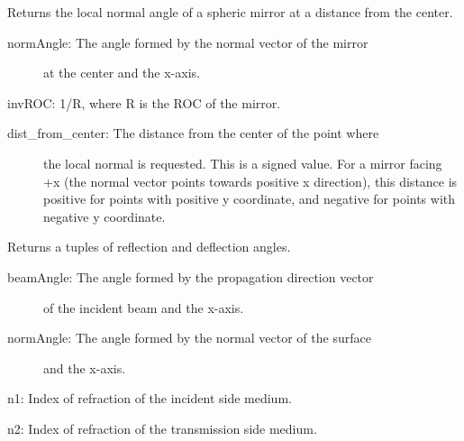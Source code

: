 \documentclass[letterpaper,10pt,english]{sphinxmanual}
\begin{document}

\begin{fulllineitems}
\label{api/gtrace.optics:gtrace.optics.geometric.normSpheric}
Returns the local normal angle of a spheric mirror
at a distance from the center.
\begin{description}
\item[{normAngle: The angle formed by the normal vector of the mirror}] \leavevmode
at the center and the x-axis.

\end{description}

invROC: 1/R, where R is the ROC of the mirror.
\begin{description}
\item[{dist\_from\_center: The distance from the center of the point where}] \leavevmode
the local normal is requested.
This is a signed value.
For a mirror facing +x (the normal vector points
towards positive x direction), this distance
is positive for points with positive y coordinate,
and negative for points with negative y coordinate.

\end{description}

\end{fulllineitems}


\begin{fulllineitems}
\label{api/gtrace.optics:gtrace.optics.geometric.refl_defl_angle}
Returns a tuples of reflection and deflection angles.
\begin{description}
\item[{beamAngle: The angle formed by the propagation direction vector}] \leavevmode
of the incident beam and the x-axis.

\item[{normAngle: The angle formed by the normal vector of the surface}] \leavevmode
and the x-axis.

\end{description}

n1: Index of refraction of the incident side medium.

n2: Index of refraction of the transmission side medium.

\end{fulllineitems}
\end{document}
